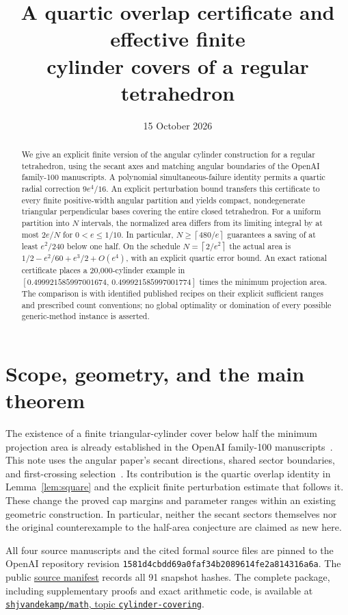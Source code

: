 \documentclass[11pt]{amsart}
\title[Effective finite cylinder covers of a tetrahedron]{A quartic overlap certificate and effective finite\texorpdfstring{\\}{} cylinder covers of a regular tetrahedron}
\date{15 October 2026}
\theoremstyle{definition}
\theoremstyle{remark}
\newcommand{\ceil}[1]{\left\lceil#1\right\rceil}
\newcommand{\repo}[2]{\href{https://github.com/shjvandekamp/math/blob/main/topics/cylinder-covering/#1}{#2}}
\begin{document}
\begin{abstract}
We give an explicit finite version of the angular cylinder construction
for a regular tetrahedron, using the secant axes and matching angular
boundaries of the OpenAI family-100 manuscripts. A polynomial
simultaneous-failure identity permits a quartic radial correction
$9e^4/16$. An explicit perturbation bound transfers this certificate to
every finite positive-width angular partition and yields compact,
nondegenerate triangular perpendicular bases covering the entire closed
tetrahedron. For a uniform partition into $N$ intervals, the normalized
area differs from its limiting integral by at most $2e/N$ for
$0<e\le1/10$. In particular, $N\ge\ceil{480/e}$ guarantees a saving
of at least $e^2/240$ below one half. On the schedule
$N=\ceil{2/e^2}$ the actual area is
$1/2-e^2/60+e^3/2+O(e^4)$, with an explicit quartic error bound.
An exact rational certificate places a 20,000-cylinder example in
$[0.499921585997001674,\,0.499921585997001774]$ times the minimum
projection area. The comparison is with identified published recipes on
their explicit sufficient ranges and prescribed count conventions;
no global optimality or domination of every possible generic-method
instance is asserted.
\end{abstract}
\maketitle

\section{Scope, geometry, and the main theorem}

The existence of a finite triangular-cylinder cover below half the minimum
projection area is already established in the OpenAI family-100
manuscripts~\cite{Angular,Radial,Ruled,Slope}. This note uses the angular
paper's secant directions, shared sector boundaries, and first-crossing
selection~\cite{Angular}. Its contribution is the quartic overlap identity
in Lemma~\ref{lem:square} and the explicit finite perturbation estimate
that follows it. These change the proved cap margins and parameter
ranges within an existing geometric construction. In particular, neither
the secant sectors themselves nor the original counterexample to the
half-area conjecture are claimed as new here.

All four source manuscripts and the cited formal source files are pinned
to the OpenAI repository revision
\texttt{1581d4cbdd69a0faf34b2089614fe2a814316a6a}. The public
\repo{sources/manifest.json}{source manifest} records all 91 snapshot
hashes. The complete package, including supplementary proofs and exact
arithmetic code, is available at
\href{https://github.com/shjvandekamp/math/tree/main/topics/cylinder-covering}{\texttt{shjvandekamp/math}, topic \texttt{cylinder-covering}}.
\end{document}
